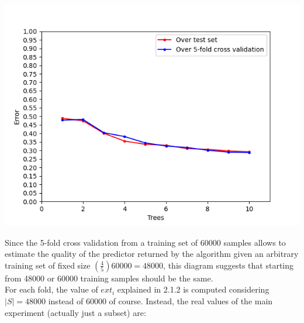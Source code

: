 \documentclass[12pt]{article}
\begin{document}
\begin{center}
\includegraphics[width=1.3\textwidth]{Images/5_fold_diag.png}
\end{center}
Since the 5-fold cross validation from a training set of 60000 samples allows to estimate the quality of the predictor returned by the algorithm given an arbitrary training set of fixed size $\left(\frac{4}{5}\right)60000 = 48000$, this diagram suggests that starting from 48000 or 60000 training samples should be the same.\\
For each fold, the value of $ext_i$ explained in 2.1.2 is computed considering $|S| = 48000$ instead of 60000 of course.
\newpage
Instead, the real values of the main experiment (actually just a subset) are:\\
\end{document}
